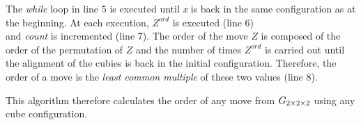 The \textit{while} loop in line 5 is executed until \textit{x} is back in the same configuration as at the beginning. 
At each execution, $Z^\textit{ord}$ is executed (line 6) \\ and \textit{count} is incremented (line 7).
The order of the move $Z$ is composed of the order of the permutation of $Z$ and the number of times $Z^\textit{ord}$ is carried out until the alignment of the cubies is back in the initial configuration. Therefore, the order of a move is the \textit{least common multiple} of these two values (line 8).

This algorithm therefore calculates the order of any move from $G_{2\times 2\times 2}$ using any cube configuration.